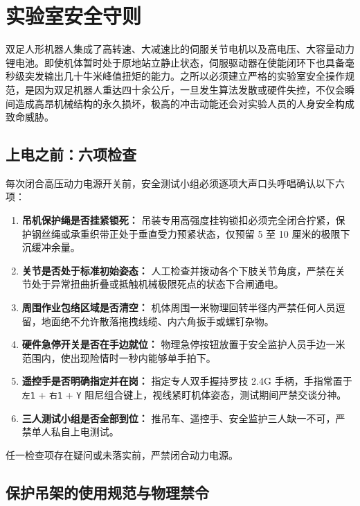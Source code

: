 \section{实验室安全守则}

双足人形机器人集成了高转速、大减速比的伺服关节电机以及高电压、大容量动力锂电池。即使机体暂时处于原地站立静止状态，伺服驱动器在使能闭环下也具备毫秒级突发输出几十牛米峰值扭矩的能力。之所以必须建立严格的实验室安全操作规范，是因为双足机器人重达四十余公斤，一旦发生算法发散或硬件失控，不仅会瞬间造成高昂机械结构的永久损坏，极高的冲击动能还会对实验人员的人身安全构成致命威胁。\practice

\subsection{上电之前：六项检查}

每次闭合高压动力电源开关前，安全测试小组必须逐项大声口头呼唱确认以下六项：

\begin{enumerate}[leftmargin=*]
    \item \textbf{吊机保护绳是否挂紧锁死：} 吊装专用高强度挂钩锁扣必须完全闭合拧紧，保护钢丝绳或承重织带正处于垂直受力预紧状态，仅预留 5 至 10 厘米的极限下沉缓冲余量。
    \item \textbf{关节是否处于标准初始姿态：} 人工检查并拨动各个下肢关节角度，严禁在关节处于异常扭曲折叠或抵触机械极限死点的状态下合闸通电。
    \item \textbf{周围作业包络区域是否清空：} 机体周围一米物理回转半径内严禁任何人员逗留，地面绝不允许散落拖拽线缆、内六角扳手或螺钉杂物。
    \item \textbf{硬件急停开关是否在手边就位：} 物理急停按钮放置于安全监护人员手边一米范围内，使出现险情时一秒内能够单手拍下。
    \item \textbf{遥控手是否明确指定并在岗：} 指定专人双手握持罗技 2.4G 手柄，手指常置于 \texttt{左1} + \texttt{右1} + \texttt{Y} 阻尼组合键上，视线紧盯机体姿态，测试期间严禁交谈分神。
    \item \textbf{三人测试小组是否全部到位：} 推吊车、遥控手、安全监护三人缺一不可，严禁单人私自上电测试。
\end{enumerate}

\noindent 任一检查项存在疑问或未落实前，严禁闭合动力电源。

\subsection{保护吊架的使用规范与物理禁令}

